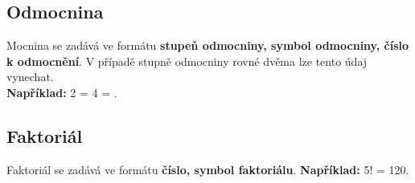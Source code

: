 \documentclass[12pt,czech]{article}
\begin{document}
\subsection{Odmocnina}
Mocnina se zadává ve formátu \textbf{stupeň odmocniny, symbol odmocniny, číslo k odmocnění}. V případě stupně odmocniny rovné dvěma lze tento údaj vynechat. \\
\textbf{Například:} 2 = 4 = .

\subsection{Faktoriál}
Faktoriál se zadává ve formátu \textbf{číslo, symbol faktoriálu}.
\textbf{Například:} 5! = 120.
\end{document}
